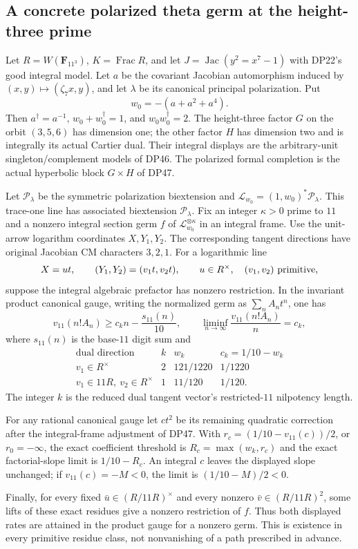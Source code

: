 \subsection{A concrete polarized theta germ at the height-three prime}

\begin{proposition}\label{DP49}
Let $R=W(\mathbf F_{11^3})$, $K=\operatorname{Frac}R$, and let
$J=\operatorname{Jac}(y^2=x^7-1)$ with DP22's good integral model.
Let $a$ be the covariant Jacobian automorphism induced by
$(x,y)\mapsto(\zeta_7x,y)$, and let $\lambda$ be its canonical principal polarization.
Put
\[
 w_0=-(a+a^2+a^4).
\]
Then $a^\dagger=a^{-1}$, $w_0+w_0^\dagger=1$, and $w_0w_0^\dagger=2$.
The height-three factor $G$ on the orbit $(3,5,6)$ has dimension one; the other factor $H$ has dimension two and is integrally its actual Cartier dual.
Their integral displays are the arbitrary-unit singleton/complement models of DP46.
The polarized formal completion is the actual hyperbolic block $G\times H$ of DP47.

Let $\mathcal P_\lambda$ be the symmetric polarization biextension and
$\mathcal L_{w_0}=(1,w_0)^*\mathcal P_\lambda$.
This trace-one line has associated biextension $\mathcal P_\lambda$.
Fix an integer $\kappa>0$ prime to $11$ and a nonzero integral section germ $f$ of
$\mathcal L_{w_0}^{\otimes\kappa}$ in an integral frame.
Use the unit-arrow logarithm coordinates $X,Y_1,Y_2$.
The corresponding tangent directions have original Jacobian CM characters $3,2,1$.
For a logarithmic line
\[
 X=ut,\qquad (Y_1,Y_2)=(v_1t,v_2t),
 \qquad u\in R^\times,\quad (v_1,v_2)\ \hbox{primitive},
\]
suppose the integral algebraic prefactor has nonzero restriction.
In the invariant product canonical gauge, writing the normalized germ as
$\sum_n A_nt^n$, one has
\[
 v_{11}(n!A_n)\ge c_kn-\frac{s_{11}(n)}{10},
 \qquad
 \liminf_{n\to\infty}\frac{v_{11}(n!A_n)}n=c_k,
\]
where $s_{11}(n)$ is the base-$11$ digit sum and
\[
\begin{array}{c|c|c|c}
\text{dual direction}&k&w_k&c_k=1/10-w_k\\ \hline
v_1\in R^\times&2&121/1220&1/1220\\
v_1\in11R,\ v_2\in R^\times&1&11/120&1/120 .
\end{array}
\]
The integer $k$ is the reduced dual tangent vector's restricted-$11$ nilpotency length.

For any rational canonical gauge let $ct^2$ be its remaining quadratic correction after the integral-frame adjustment of DP47.
With $r_c=(1/10-v_{11}(c))/2$, or $r_0=-\infty$, the exact coefficient threshold is
$R_c=\max(w_k,r_c)$ and the exact factorial-slope limit is $1/10-R_c$.
An integral $c$ leaves the displayed slope unchanged; if $v_{11}(c)=-M<0$, the limit is
$(1/10-M)/2<0$.

Finally, for every fixed $\bar u\in(R/11R)^\times$ and every nonzero
$\bar v\in(R/11R)^2$, some lifts of these exact residues give a nonzero restriction of $f$.
Thus both displayed rates are attained in the product gauge for a nonzero germ.
This is existence in every primitive residue class, not nonvanishing of a path prescribed in advance.
\end{proposition}

